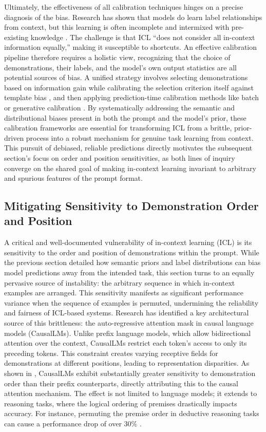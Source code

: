 \documentclass[11pt]{article}
\begin{document}
Ultimately, the effectiveness of all calibration techniques hinges on a precise diagnosis of the bias. Research has shown that models do learn label relationships from context, but this learning is often incomplete and intermixed with pre-existing knowledge \cite{ref51}. The challenge is that ICL ``does not consider all in-context information equally,'' making it susceptible to shortcuts. An effective calibration pipeline therefore requires a holistic view, recognizing that the choice of demonstrations, their labels, and the model's own output statistics are all potential sources of bias. A unified strategy involves selecting demonstrations based on information gain while calibrating the selection criterion itself against template bias \cite{ref130}, and then applying prediction-time calibration methods like batch or generative calibration \cite{ref178,ref179}. By systematically addressing the semantic and distributional biases present in both the prompt and the model's prior, these calibration frameworks are essential for transforming ICL from a brittle, prior-driven process into a robust mechanism for genuine task learning from context. This pursuit of debiased, reliable predictions directly motivates the subsequent section's focus on order and position sensitivities, as both lines of inquiry converge on the shared goal of making in-context learning invariant to arbitrary and spurious features of the prompt format.

\subsection{Mitigating Sensitivity to Demonstration Order and Position}

A critical and well-documented vulnerability of in-context learning (ICL) is its sensitivity to the order and position of demonstrations within the prompt. While the previous section detailed how semantic priors and label distributions can bias model predictions away from the intended task, this section turns to an equally pervasive source of instability: the arbitrary sequence in which in-context examples are arranged. This sensitivity manifests as significant performance variance when the sequence of examples is permuted, undermining the reliability and fairness of ICL-based systems. Research has identified a key architectural source of this brittleness: the auto-regressive attention mask in causal language models (CausalLMs). Unlike prefix language models, which allow bidirectional attention over the context, CausalLMs restrict each token's access to only its preceding tokens. This constraint creates varying receptive fields for demonstrations at different positions, leading to representation disparities. As shown in \cite{ref180}, CausalLMs exhibit substantially greater sensitivity to demonstration order than their prefix counterparts, directly attributing this to the causal attention mechanism. The effect is not limited to language models; it extends to reasoning tasks, where the logical ordering of premises drastically impacts accuracy. For instance, permuting the premise order in deductive reasoning tasks can cause a performance drop of over 30\% \cite{ref181}.
\end{document}
